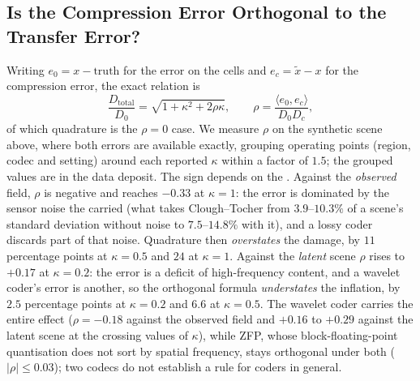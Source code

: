 \subsection{Is the Compression Error Orthogonal to the Transfer Error?}
\label{app:cross_term}\label{sec:cross_term}
Writing $e_0 = x - \text{truth}$ for the  error on the
 cells and $e_c = \tilde{x} - x$ for the compression error,
the exact relation is
\begin{equation}
\frac{D_{\mathrm{total}}}{D_0} = \sqrt{1 + \kappa^2 + 2\rho\kappa},
\qquad \rho = \frac{\langle e_0, e_c\rangle}{D_0 D_c},
\label{eq:cross_term}
\end{equation}
of which quadrature is the $\rho = 0$ case. We measure $\rho$ on the
synthetic scene above, where both errors are available exactly, grouping
operating points (region, codec and setting) around each reported
$\kappa$ within a factor of $1.5$; the grouped values are in the data
deposit. The sign depends on the . Against the
\emph{observed} field, $\rho$ is negative and reaches $-0.33$ at
$\kappa=1$: the  error is dominated by the sensor noise the
 carried (what takes Clough--Tocher from $3.9$--$10.3\%$ of
a scene's standard deviation without noise to $7.5$--$14.8\%$ with it),
and a lossy coder discards part of that noise. Quadrature then
\emph{overstates} the damage, by $11$ percentage points at $\kappa=0.5$
and $24$ at $\kappa=1$. Against the \emph{latent} scene $\rho$ rises to
$+0.17$ at $\kappa=0.2$: the  error is a deficit of
high-frequency content, and a wavelet coder's error is another, so the
orthogonal formula \emph{understates} the inflation, by $2.5$ percentage
points at $\kappa=0.2$ and $6.6$ at $\kappa=0.5$. The wavelet coder
carries the entire effect ($\rho = -0.18$ against the observed field and
$+0.16$ to $+0.29$ against the latent scene at the crossing values of
$\kappa$), while ZFP, whose block-floating-point quantisation does not
sort by spatial frequency, stays orthogonal under both 
($|\rho| \le 0.03$); two codecs do not establish a rule for coders in
general.



